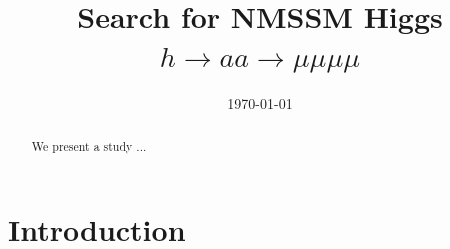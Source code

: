 \documentclass[aps,prd,onecolumn,superscriptaddress,showpacs]{revtex4}
\begin{document}


\title{
{\large\bf
 Search for NMSSM Higgs $h \to aa \to \mu \mu \mu \mu$      
}
}




\date{\today}


\begin{abstract}

We present a study ... 

\end{abstract}


\maketitle

%







%

\section{Introduction}
\end{document}

